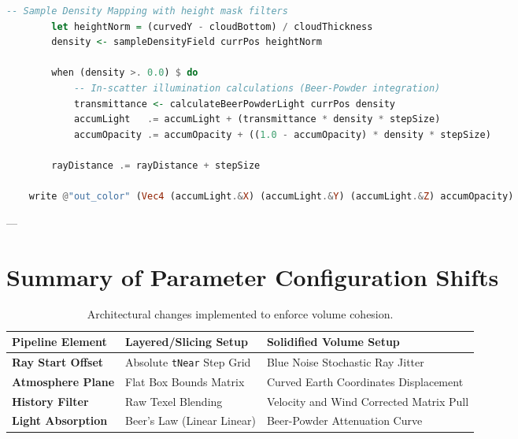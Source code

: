 \documentclass[11pt,a4paper]{article}
\begin{document}
\begin{lstlisting}[language=Haskell, caption={Haskell FIR DSL Implementation for Curved Volumetric Shells}]
        -- Sample Density Mapping with height mask filters
        let heightNorm = (curvedY - cloudBottom) / cloudThickness
        density <- sampleDensityField currPos heightNorm
        
        when (density >. 0.0) $ do
            -- In-scatter illumination calculations (Beer-Powder integration)
            transmittance <- calculateBeerPowderLight currPos density
            accumLight   .= accumLight + (transmittance * density * stepSize)
            accumOpacity .= accumOpacity + ((1.0 - accumOpacity) * density * stepSize)
            
        rayDistance .= rayDistance + stepSize
        
    write @"out_color" (Vec4 (accumLight.&X) (accumLight.&Y) (accumLight.&Z) accumOpacity)
\end{lstlisting}

---

\section{Summary of Parameter Configuration Shifts}

\begin{table}[h!]
\centering
\small
\begin{tabular}{lll}
\toprule
\textbf{Pipeline Element} & \textbf{Layered/Slicing Setup} & \textbf{Solidified Volume Setup} \\ \midrule
\textbf{Ray Start Offset} & Absolute \texttt{tNear} Step Grid & Blue Noise Stochastic Ray Jitter \\
\textbf{Atmosphere Plane} & Flat Box Bounds Matrix & Curved Earth Coordinates Displacement \\
\textbf{History Filter} & Raw Texel Blending & Velocity and Wind Corrected Matrix Pull \\
\textbf{Light Absorption} & Beer's Law (Linear Linear) & Beer-Powder Attenuation Curve \\ \bottomrule
\end{tabular}
\caption{Architectural changes implemented to enforce volume cohesion.}
\end{table}
\end{document}
